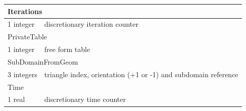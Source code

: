 \documentclass[a4paper,12pt]{article}
\begin{document}
\begin{tabular}{|m{4cm}|m{11cm}|}
\multicolumn{2}{|l|}{Iterations} \\
\hline
1 integer & discretionary iteration counter \\
\hline\hline

\multicolumn{2}{|l|}{PrivateTable} \\
\hline
1 integer & free form table \\
\hline\hline

\multicolumn{2}{|l|}{SubDomainFromGeom} \\
\hline
3 integers & triangle index, orientation (+1 or -1) and subdomain reference \\
\hline\hline

\multicolumn{2}{|l|}{Time} \\
\hline
1 real & discretionary time counter \\
\hline

\end{tabular}
\end{document}
